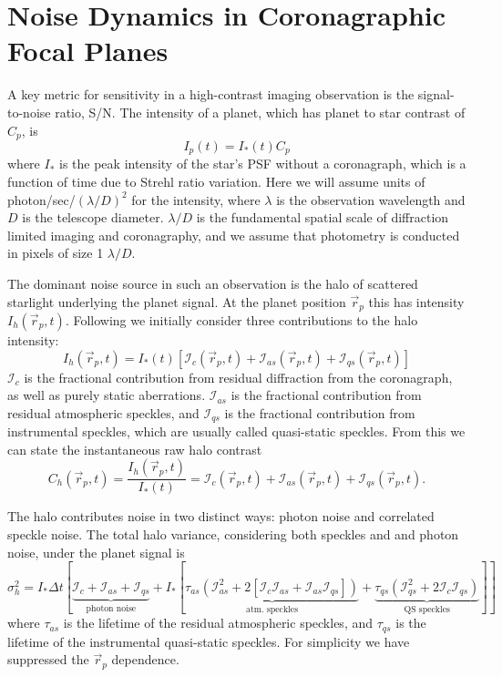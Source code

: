 \documentclass[10pt,preprint]{aastex631}
\begin{document}
\section{Noise Dynamics in Coronagraphic Focal Planes}
\label{sec:noise}
A key metric for sensitivity in a high-contrast imaging observation is the signal-to-noise ratio, S/N.  The intensity of a planet, which has planet to star contrast of $C_p$, is 
\begin{equation}
I_p(t) = I_{*}(t) C_p
\label{eqn:signal}
\end{equation}
where $I_{*}$ is the peak intensity of the star's PSF without a coronagraph, which is a function of time due to Strehl ratio variation.  Here we will assume units of photon/sec/$(\lambda/D)^2$ for the intensity, where $\lambda$ is the observation wavelength and $D$ is the telescope diameter.  $\lambda/D$ is the fundamental spatial scale of diffraction limited imaging and coronagraphy, and we assume that photometry is conducted in pixels of size 1 $\lambda/D$.

The dominant noise source in such an observation is the halo of scattered starlight underlying the planet signal.  At the planet position $\vec{r}_p$ this has intensity $I_h(\vec{r}_p,t)$. Following \citet{2007ApJ...669..642S} we initially consider three contributions to the halo intensity:
\begin{equation}
I_h(\vec{r}_p,t) = I_{*}(t)\left[\mathcal{I}_c(\vec{r}_p,t) + \mathcal{I}_{as}(\vec{r}_p,t) + \mathcal{I}_{qs}(\vec{r}_p,t)\right]
\end{equation}
$\mathcal{I}_c$ is the fractional contribution from residual diffraction from the coronagraph, as well as purely static aberrations.  $\mathcal{I}_{as}$ is the fractional contribution from residual atmospheric speckles, and $\mathcal{I}_{qs}$ is the fractional contribution from instrumental speckles, which are usually called quasi-static speckles.  
From this we can state the instantaneous raw halo contrast
\begin{equation}
C_h(\vec{r}_p,t) = \frac{I_h(\vec{r}_p,t)}{I_*(t)} = \mathcal{I}_c(\vec{r}_p,t) + \mathcal{I}_{as}(\vec{r}_p,t) + \mathcal{I}_{qs}(\vec{r}_p,t).
\end{equation}

The halo contributes noise in two distinct ways: photon noise and correlated speckle noise. The total halo variance, considering both speckles and and photon noise, under the planet signal is \citep{2007ApJ...669..642S} 
\begin{equation}
\sigma^2_{h}  = I_* \Delta t [\underbrace{\mathcal{I}_c + \mathcal{I}_{as} + \mathcal{I}_{qs}}_{\mbox{photon noise}} + I_* [ \underbrace{\tau_{as}\left(\mathcal{I}_{as}^2 + 2[\mathcal{I}_c\mathcal{I}_{as} + \mathcal{I}_{as}\mathcal{I}_{qs}]  \right)}_{\mbox{atm. speckles}} +  \underbrace{\tau_{qs}\left( \mathcal{I}_{qs}^2 + 2 \mathcal{I}_c \mathcal{I}_{qs}\right)}_{\mbox{QS speckles}}]]
\label{eqn:variance}
\end{equation}
where $\tau_{as}$ is the lifetime of the residual atmospheric speckles, and $\tau_{qs}$ is the lifetime of the instrumental quasi-static speckles.  For simplicity we have suppressed the $\vec{r}_p$ dependence.   
\end{document}
